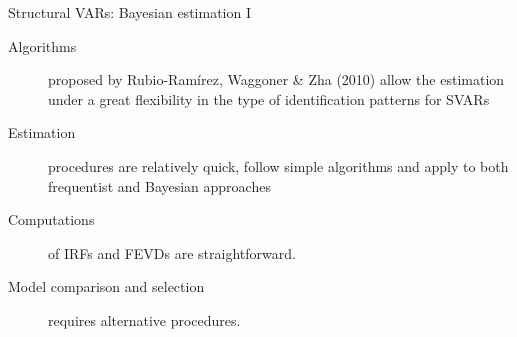 \documentclass[notes,blackandwhite,mathsans,usenames,dvipsnames]{beamer}
\begin{document}
{
\begin{frame}{Structural VARs: Bayesian estimation I}
\begin{description}
\item[Algorithms] {\color{mcxs2}proposed by} Rubio-Ram\'irez, Waggoner \& Zha (2010) {\color{mcxs2}allow the estimation under a great flexibility in the type of identification patterns for SVARs }

\bigskip\item[Estimation] {\color{mcxs2}procedures are relatively quick, follow simple algorithms and apply to both frequentist and Bayesian approaches}

\bigskip\item[Computations] {\color{mcxs2}of IRFs and FEVDs are straightforward. }

\bigskip\item[Model comparison and selection] {\color{mcxs2}requires alternative procedures.}
\end{description}
\end{frame}
}
\end{document}
